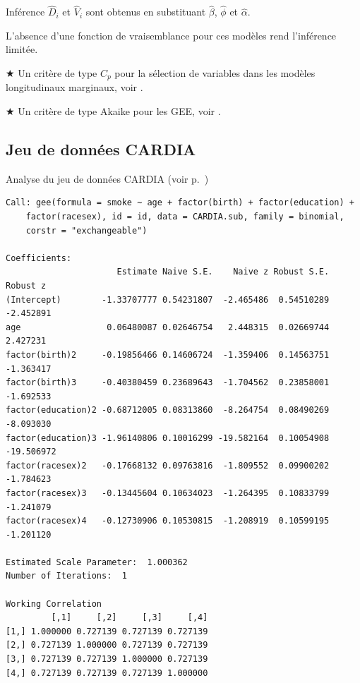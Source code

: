 \documentclass{BeamerTemplate}
\begin{document}
\begin{refsection}
\begin{frame}{Inférence}
\smallskip
$\hat{D}_i$ et $\hat{V}_i$ sont obtenus en substituant $\hat{\beta}$,
$\hat{\phi}$ et $\hat{\alpha}$.
\end{frame}

\begin{frame}{}
L'absence d'une fonction de vraisemblance pour ces modèles rend l'inférence
limitée.

\bigskip
\bigskip
{\color{red} $\bigstar$ Un critère de type $C_p$ pour la sélection de variables
  dans les modèles longitudinaux marginaux, voir .}

\bigskip
{\color{red} $\bigstar$ Un critère de type Akaike pour les GEE, voir
  .}
\end{frame}

\subsection{Jeu de données CARDIA}
\begin{frame}[fragile]{Analyse du jeu de données CARDIA (voir p.~\pageref{CARDIApage})}
{\tiny
\begin{verbatim}
Call: gee(formula = smoke ~ age + factor(birth) + factor(education) + 
    factor(racesex), id = id, data = CARDIA.sub, family = binomial, 
    corstr = "exchangeable")

Coefficients:
                      Estimate Naive S.E.    Naive z Robust S.E.   Robust z
(Intercept)        -1.33707777 0.54231807  -2.465486  0.54510289  -2.452891
age                 0.06480087 0.02646754   2.448315  0.02669744   2.427231
factor(birth)2     -0.19856466 0.14606724  -1.359406  0.14563751  -1.363417
factor(birth)3     -0.40380459 0.23689643  -1.704562  0.23858001  -1.692533
factor(education)2 -0.68712005 0.08313860  -8.264754  0.08490269  -8.093030
factor(education)3 -1.96140806 0.10016299 -19.582164  0.10054908 -19.506972
factor(racesex)2   -0.17668132 0.09763816  -1.809552  0.09900202  -1.784623
factor(racesex)3   -0.13445604 0.10634023  -1.264395  0.10833799  -1.241079
factor(racesex)4   -0.12730906 0.10530815  -1.208919  0.10599195  -1.201120

Estimated Scale Parameter:  1.000362
Number of Iterations:  1

Working Correlation
         [,1]     [,2]     [,3]     [,4]
[1,] 1.000000 0.727139 0.727139 0.727139
[2,] 0.727139 1.000000 0.727139 0.727139
[3,] 0.727139 0.727139 1.000000 0.727139
[4,] 0.727139 0.727139 0.727139 1.000000
\end{verbatim}
}
\end{frame}


\end{refsection}
\end{document}
